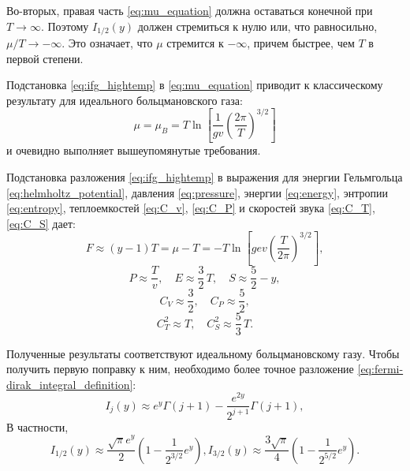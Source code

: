 Во-вторых, правая часть \eqref{eq:mu_equation} должна оставаться конечной при $T \to \infty$.
Поэтому $I _{1 / 2} (y)$ должен стремиться к нулю или, что равносильно, $\mu / T \to -\infty$.
Это означает, что $\mu$ стремится к $-\infty$, причем быстрее, чем $T$ в первой степени.

Подстановка \eqref{eq:ifg_hightemp} в \eqref{eq:mu_equation} приводит к классическому результату для идеального больцмановского газа:
\begin{equation}
    \label{eq:mu_boltzman}
    \mu = \mu_B = T\ln\left[ \frac{1}{gv}\left( \frac{2\pi}{T} \right)^{3/2} \right]
\end{equation}
и очевидно выполняет вышеупомянутые требования.

Подстановка разложения \eqref{eq:ifg_hightemp} в выражения для энергии Гельмгольца \eqref{eq:helmholtz_potential}, давления \eqref{eq:pressure}, энергии \eqref{eq:energy}, энтропии \eqref{eq:entropy}, теплоемкостей \eqref{eq:C_v}, \eqref{eq:C_P} и скоростей звука \eqref{eq:C_T}, \eqref{eq:C_S} дает:
\begin{equation}
    F\approx (y - 1)T = \mu - T = -T\ln\left[ gev\left( \frac{T}{2\pi} \right)^{3/2} \right],
\end{equation}
\begin{equation}
    P\approx \frac{T}{v},\quad
    E\approx \frac{3}{2}\,T,\quad
    S\approx \frac{5}{2} - y,
\end{equation}
\begin{equation}
    C_{V}\approx \frac{3}{2},\quad
    C_{P}\approx \frac{5}{2},
\end{equation}
\begin{equation}
    C_{T}^2\approx T,\quad
    C_{S}^2\approx \frac{5}{3}\, T.
\end{equation}

Полученные результаты соответствуют идеальному больцмановскому газу. Чтобы получить первую поправку к ним, необходимо более точное разложение \eqref{eq:fermi-dirak_integral_definition}:
\begin{equation}
    \label{eq:ifg_hightemp_precise}
    I_j(y)\approx e^y \Gamma(j + 1) - \frac{e^{2y}}{2^{j+1}}\Gamma(j + 1),
\end{equation}
В частности,
\begin{equation*}
  I_{1/2}(y)\approx \frac{\sqrt{\pi}e^y}{2}\left(
    1 - \frac{1}{2^{3/2}}e^y
  \right),
  I_{3/2}(y)\approx \frac{3\sqrt{\pi}}{4}\left(
    1 - \frac{1}{2^{5/2}}e^y
  \right).
\end{equation*}

